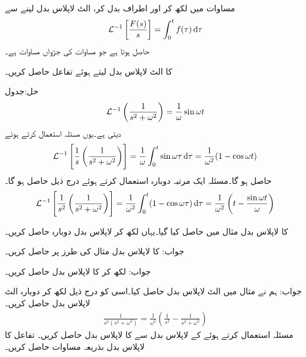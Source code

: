 مساوات  میں  لکھ کر اور اطراف بدل کر، الٹ لاپلاس بدل لینے سے
\begin{align}
\Laplace^{-1}\left[\frac{F(s)}{s}\right]=\int_{0}^{t} f(\tau)\dif \tau
\end{align}
حاصل ہوتا ہے جو مساوات  کی جڑواں مساوات ہے۔

 کا الٹ لاپلاس بدل لیتے ہوئے تفاعل  حاصل کریں۔

حل:جدول  
\begin{align*}
\mathcal{L}^{-1}\left(\frac{1}{s^2+\omega^2}\right)=\frac{1}{\omega}\sin \omega t
\end{align*}
دیتی ہے۔یوں مسئلہ  استعمال کرتے ہوئے
\begin{align*}
\Laplace^{-1}\left[\frac{1}{s}\left(\frac{1}{s^2+\omega^2}\right)\right]=\frac{1}{\omega} \int_{0}^{t}\sin \omega \tau \dif \tau=\frac{1}{\omega^2} (1-\cos \omega t)
\end{align*}
حاصل ہو گا۔مسئلہ  ایک مرتبہ دوبارہ استعمال کرتے ہوئے درج ذیل حاصل ہو گا۔
\begin{align*}
\Laplace^{-1}\left[\frac{1}{s^2} \left(\frac{1}{s^2+\omega^2}\right)\right]=\frac{1}{\omega^2} \int_{0}^{t}(1-\cos \omega \tau) \dif \tau=\frac{1}{\omega^2}\left(t-\frac{\sin \omega t}{\omega}\right)
\end{align*}


 کا لاپلاس بدل مثال  میں حاصل کیا گیا۔یہاں  لکھ کر لاپلاس بدل دوبارہ حاصل کریں۔

جواب:
 کا لاپلاس بدل مثال  کی طرز پر حاصل کریں۔

جواب:
 لکھ کر  کا لاپلاس بدل حاصل کریں۔

جواب:
ہم نے مثال  میں الٹ لاپلاس بدل حاصل کیا۔اسی کو درج ذیل لکھ کر دوبارہ الٹ لاپلاس بدل حاصل کریں۔
\begin{align*}
\frac{1}{s^2(s^2+\omega^2)}=\frac{1}{\omega^2}\left(\frac{1}{s^2}-\frac{1}{s^2+\omega^2}\right)
\end{align*}
مسئلہ  استعمال کرتے ہوئے  کے لاپلاس بدل سے  کا لاپلاس بدل حاصل کریں۔ 
تفاعل  کا لاپلاس بدل بذریعہ مساوات  حاصل کریں۔

